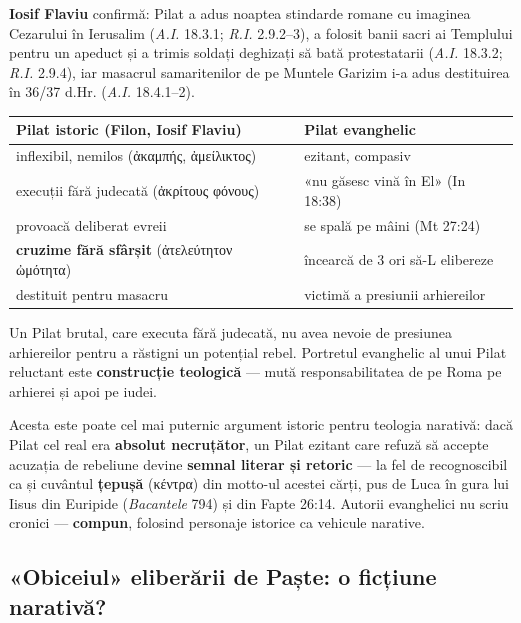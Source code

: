 \documentclass[12pt,a4paper,twoside,openany]{book}
\begin{document}
\textbf{Iosif Flaviu} confirmă: Pilat a adus noaptea stindarde romane cu imaginea Cezarului în Ierusalim (\textit{A.I.} 18.3.1; \textit{R.I.} 2.9.2--3), a folosit banii sacri ai Templului pentru un apeduct și a trimis soldați deghizați să bată protestatarii (\textit{A.I.} 18.3.2; \textit{R.I.} 2.9.4), iar masacrul samaritenilor de pe Muntele Garizim i-a adus destituirea în 36/37 d.Hr. (\textit{A.I.} 18.4.1--2).

\begin{center}
\small
\begin{tabularx}{\textwidth}{L{5.5cm}X}
\toprule
{}
\textbf{Pilat istoric} (Filon, Iosif Flaviu) & \textbf{Pilat evanghelic} \\
\midrule
inflexibil, nemilos (ἀκαμπής, ἀμείλικτος) & ezitant, compasiv \\
execuții fără judecată (ἀκρίτους φόνους) & «nu găsesc vină în El» (In 18:38) \\
provoacă deliberat evreii & se spală pe mâini (Mt 27:24) \\
\textbf{cruzime fără sfârșit} (ἀτελεύτητον ὠμότητα) & încearcă de 3 ori să-L elibereze \\
destituit pentru masacru & victimă a presiunii arhiereilor \\
\bottomrule
\end{tabularx}
\end{center}

Un Pilat brutal, care executa fără judecată, nu avea nevoie de presiunea arhiereilor pentru a răstigni un potențial rebel. Portretul evanghelic al unui Pilat reluctant este \textbf{construcție teologică} — mută responsabilitatea de pe Roma pe arhierei și apoi pe iudei.

Acesta este poate cel mai puternic argument istoric pentru teologia narativă: dacă Pilat cel real era \textbf{absolut necruțător}, un Pilat ezitant care refuză să accepte acuzația de rebeliune devine \textbf{semnal literar și retoric} — la fel de recognoscibil ca și cuvântul \textbf{țepușă} (κέντρα) din motto-ul acestei cărți, pus de Luca în gura lui Iisus din Euripide (\textit{Bacantele} 794) și din Fapte 26:14. Autorii evanghelici nu scriu cronici — \textbf{compun}, folosind personaje istorice ca vehicule narative.

\subsection{«Obiceiul» eliberării de Paște: o ficțiune narativă?}
\end{document}
